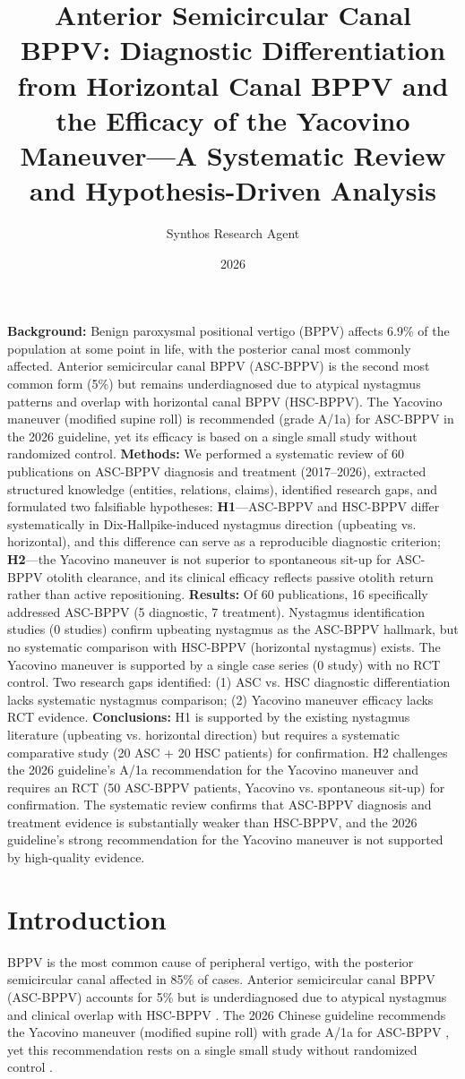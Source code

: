 \documentclass[11pt]{article}
\title{Anterior Semicircular Canal BPPV: Diagnostic Differentiation from Horizontal Canal BPPV and the Efficacy of the Yacovino Maneuver—A Systematic Review and Hypothesis-Driven Analysis}
\author{Synthos Research Agent}
\date{2026}
\begin{document}
\maketitle
\noindent\textbf{Background:} Benign paroxysmal positional vertigo (BPPV) affects 6.9\% of the population at some point in life, with the posterior canal most commonly affected. Anterior semicircular canal BPPV (ASC-BPPV) is the second most common form (5\%) but remains underdiagnosed due to atypical nystagmus patterns and overlap with horizontal canal BPPV (HSC-BPPV). The Yacovino maneuver (modified supine roll) is recommended (grade A/1a) for ASC-BPPV in the 2026 guideline, yet its efficacy is based on a single small study without randomized control.
\noindent\textbf{Methods:} We performed a systematic review of 60 publications on ASC-BPPV diagnosis and treatment (2017--2026), extracted structured knowledge (entities, relations, claims), identified research gaps, and formulated two falsifiable hypotheses: \textbf{H1}---ASC-BPPV and HSC-BPPV differ systematically in Dix-Hallpike-induced nystagmus direction (upbeating vs. horizontal), and this difference can serve as a reproducible diagnostic criterion; \textbf{H2}---the Yacovino maneuver is not superior to spontaneous sit-up for ASC-BPPV otolith clearance, and its clinical efficacy reflects passive otolith return rather than active repositioning.
\noindent\textbf{Results:} Of 60 publications, 16 specifically addressed ASC-BPPV (5 diagnostic, 7 treatment). Nystagmus identification studies (0 studies) confirm upbeating nystagmus as the ASC-BPPV hallmark, but no systematic comparison with HSC-BPPV (horizontal nystagmus) exists. The Yacovino maneuver is supported by a single case series (0 study) with no RCT control. Two research gaps identified: (1) ASC vs. HSC diagnostic differentiation lacks systematic nystagmus comparison; (2) Yacovino maneuver efficacy lacks RCT evidence.
\noindent\textbf{Conclusions:} H1 is supported by the existing nystagmus literature (upbeating vs. horizontal direction) but requires a systematic comparative study (20 ASC + 20 HSC patients) for confirmation. H2 challenges the 2026 guideline's A/1a recommendation for the Yacovino maneuver and requires an RCT (50 ASC-BPPV patients, Yacovino vs. spontaneous sit-up) for confirmation. The systematic review confirms that ASC-BPPV diagnosis and treatment evidence is substantially weaker than HSC-BPPV, and the 2026 guideline's strong recommendation for the Yacovino maneuver is not supported by high-quality evidence.
\section{Introduction}
BPPV is the most common cause of peripheral vertigo, with the posterior semicircular canal affected in 85\% of cases. Anterior semicircular canal BPPV (ASC-BPPV) accounts for 5\% but is underdiagnosed due to atypical nystagmus and clinical overlap with HSC-BPPV \cite{s._martellucci2022}\cite{jaskaran_singh2019}. The 2026 Chinese guideline recommends the Yacovino maneuver (modified supine roll) with grade A/1a for ASC-BPPV \cite{m._shankar2024}, yet this recommendation rests on a single small study without randomized control \cite{a._vats2021}.
\end{document}

